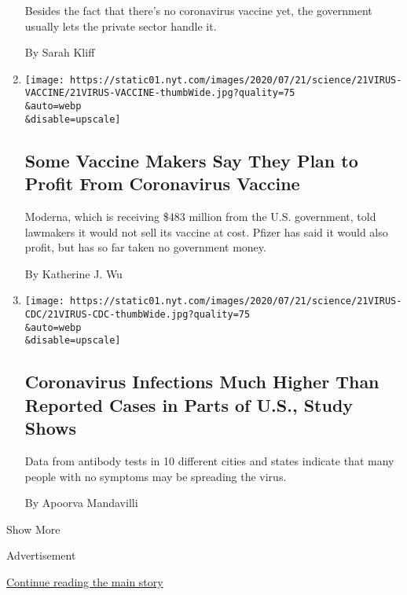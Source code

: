 \begin{enumerate}
  Besides the fact that there's no coronavirus vaccine yet, the
  government usually lets the private sector handle it.

  By Sarah Kliff
\item
  \href{/2020/07/21/health/covid-19-vaccine-coronavirus-moderna-pfizer.html}{}

  \texttt{[image: https://static01.nyt.com/images/2020/07/21/science/21VIRUS-VACCINE/21VIRUS-VACCINE-thumbWide.jpg?quality=75\\\&auto=webp\\\&disable=upscale]}

  \hypertarget{some-vaccine-makers-say-they-plan-to-profit-from-coronavirus-vaccine}{%
  \subsection{Some Vaccine Makers Say They Plan to Profit From
  Coronavirus
  Vaccine}\label{some-vaccine-makers-say-they-plan-to-profit-from-coronavirus-vaccine}}

  Moderna, which is receiving \$483 million from the U.S. government,
  told lawmakers it would not sell its vaccine at cost. Pfizer has said
  it would also profit, but has so far taken no government money.

  By Katherine J. Wu
\item
  \href{/2020/07/21/health/coronavirus-infections-us.html}{}

  \texttt{[image: https://static01.nyt.com/images/2020/07/21/science/21VIRUS-CDC/21VIRUS-CDC-thumbWide.jpg?quality=75\\\&auto=webp\\\&disable=upscale]}

  \hypertarget{coronavirus-infections-much-higher-than-reported-cases-in-parts-of-us-study-shows}{%
  \subsection{Coronavirus Infections Much Higher Than Reported Cases in
  Parts of U.S., Study
  Shows}\label{coronavirus-infections-much-higher-than-reported-cases-in-parts-of-us-study-shows}}

  Data from antibody tests in 10 different cities and states indicate
  that many people with no symptoms may be spreading the virus.

  By Apoorva Mandavilli
\end{enumerate}

Show More

Advertisement

\protect\hyperlink{after-mid2}{Continue reading the main story}

